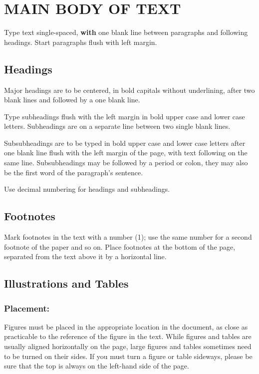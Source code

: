 \documentclass{isprs}
\begin{document}
\section{MAIN BODY OF TEXT}\label{sec:MAIN BODY OF TEXT}

Type text single-spaced, \textbf{with} one blank line between paragraphs and 
following headings. Start paragraphs flush with left margin.


\subsection{Headings}\label{sec:Headings}

Major headings are to be centered, in bold capitals without 
underlining, after two blank lines and followed by a one blank line.

Type subheadings flush with the left margin in bold upper case and lower 
case letters. Subheadings are on a separate line between two single blank lines.

Subsubheadings are to be typed in bold upper case and lower case letters 
after one blank line flush with the left margin of the page, with text 
following on the same line. Subsubheadings may be followed by a period 
or colon, they may also be the first word of the paragraph's sentence.

Use decimal numbering for headings and subheadings.


\subsection{Footnotes}\label{sec:Footnotes}

Mark footnotes in the text with a number (1); use the same number for a 
second footnote of the paper and so on. Place footnotes at the bottom of 
the page, separated from the text above it by a horizontal line.


\subsection{Illustrations and Tables}\label{sec:Illustrations and Tables}

\subsubsection{Placement:}\label{sec:Placement}

Figures must be placed in the appropriate location in the document, 
as close as practicable to the reference of the figure in the text. 
While figures and tables are usually aligned horizontally on the page, 
large figures and tables sometimes need to be turned on their sides. 
If you must turn a figure or table sideways, please be sure that the 
top is always on the left-hand side of the page.
\end{document}
